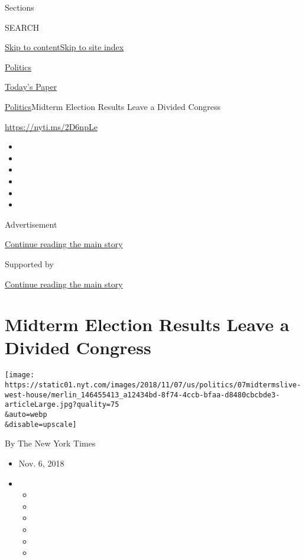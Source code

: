 Sections

SEARCH

\protect\hyperlink{site-content}{Skip to
content}\protect\hyperlink{site-index}{Skip to site index}

\href{https://www.nytimes.com/section/politics}{Politics}

\href{https://myaccount.nytimes.com/auth/login?response_type=cookie\&client_id=vi}{}

\href{https://www.nytimes.com/section/todayspaper}{Today's Paper}

\href{/section/politics}{Politics}\textbar{}Midterm Election Results
Leave a Divided Congress

\url{https://nyti.ms/2D6npLe}

\begin{itemize}
\item
\item
\item
\item
\item
\item
\end{itemize}

Advertisement

\protect\hyperlink{after-top}{Continue reading the main story}

Supported by

\protect\hyperlink{after-sponsor}{Continue reading the main story}

\hypertarget{midterm-election-results-leave-a-divided-congress}{%
\section{Midterm Election Results Leave a Divided
Congress}\label{midterm-election-results-leave-a-divided-congress}}

\texttt{[image: https://static01.nyt.com/images/2018/11/07/us/politics/07midtermslive-west-house/merlin\_146455413\_a12434bd-8f74-4ccb-bfaa-d8480cbcbde3-articleLarge.jpg?quality=75\\\&auto=webp\\\&disable=upscale]}

By The New York Times

\begin{itemize}
\item
  Nov. 6, 2018
\item
  \begin{itemize}
  \item
  \item
  \item
  \item
  \item
  \item
  \end{itemize}
\end{itemize}

